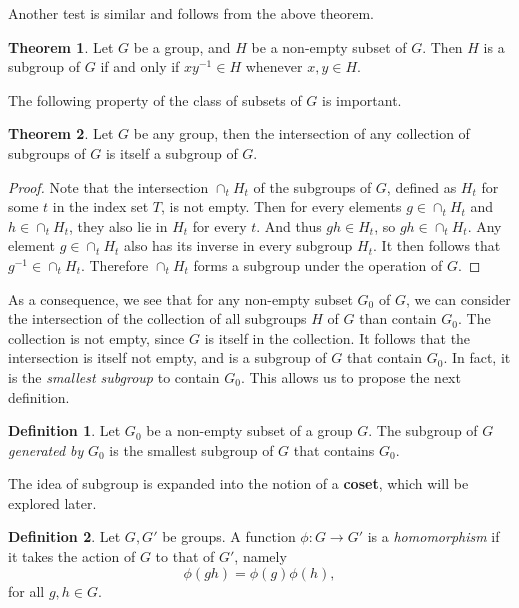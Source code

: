 \documentclass[12pt]{book}
\newcommand{\ra}{\rightarrow}
\theoremstyle{definition}
\newtheorem{definition}{Definition}[section]
\newtheorem{theorem}{Theorem}[chapter]
\theoremstyle{remark}
\begin{document}
		Another test is similar and follows from the above theorem.
		\begin{theorem}
			Let $G$ be a group, and $H$ be a non-empty subset of $G$. Then $H$ is a subgroup of $G$ if and only if $xy^{-1} \in H$ whenever $x,y \in H$.
		\end{theorem}
		
			The following property of the class of subsets of $G$ is important.
		\begin{theorem}
			Let $G$ be any group, then the intersection of any collection of subgroups of $G$ is itself a subgroup of $G$.
		\end{theorem}
			\begin{proof}
				Note that the intersection $\cap_t H_t$ of the subgroups of $G$, defined as $H_t$ for some $t$ in the index set $T$, is not empty. Then for every elements $g \in \cap_t H_t$ and $h \in \cap_t H_t$, they also lie in $H_t$ for every $t$. And thus $gh \in H_t$, so $gh \in \cap_t H_t$. Any element $g \in \cap_t H_t$ also has its inverse in every subgroup $H_t$. It then follows that $g^{-1} \in \cap_t H_t$. Therefore $\cap_t H_t$ forms a subgroup under the operation of $G$.
			\end{proof}
		
			As a consequence, we see that for any non-empty subset $G_0$ of $G$, we can consider the intersection of the collection of all subgroups $H$ of $G$ than contain $G_0$. The collection is not empty, since $G$ is itself in the collection. It follows that the intersection is itself not empty, and is a subgroup of $G$ that contain $G_0$. In fact, it is the \textit{smallest subgroup} to contain $G_0$. This allows us to propose the next definition.
			
			\begin{definition}
				Let $G_0$ be a non-empty subset of a group $G$. The subgroup of $G$ \textit{generated by} $G_0$ is the smallest subgroup of $G$ that contains $G_0$.
			\end{definition}
			
			The idea of subgroup is expanded into the notion of a \textbf{coset}, which will be explored later.
		\begin{definition}
			Let $G, G'$ be groups. A function $\phi \colon G \ra G'$ is a \textit{homomorphism} if it takes the action of $G$ to that of $G'$, namely
			\begin{equation*}
					\phi(gh) = \phi(g)\phi(h),
			\end{equation*}
			for all $g, h \in G$.
		\end{definition}
			
\end{document}
